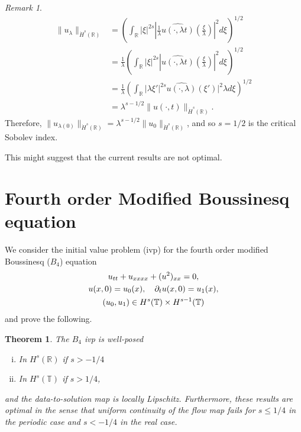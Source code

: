\documentclass[12pt,reqno]{amsart}
\numberwithin{equation}{section}  %
\numberwithin{figure}{section}
\newcommand{\rr}{\mathbb{R}}
\newcommand{\ci}{\mathbb{T}}
\newcommand{\wh}{\widehat}
\newcommand{\p}{\partial}
\theoremstyle{plain}
\newtheorem{theorem}{Theorem}
\theoremstyle{definition}
\theoremstyle{remark}
\newtheorem{remark}{Remark}
\begin{document}
\begin{itemize}
\begin{framed}
\begin{remark}
\begin{equation*}
\begin{split}
  \| u_{\lambda} \|_{\dot{H}^s(\rr)} 
  & = \left( \int_{\rr} | \xi |^{2s} |
  \frac{1}{\lambda}\wh{u(\cdot, \lambda t)}(\frac{\xi}{\lambda}) |^2 d \xi
  \right)^{1/2}
  \\
  & = \frac{1}{\lambda} \left( \int_{\rr}| \xi |^{2s} | \wh{u(\cdot,
  \lambda t)}(\frac{\xi}{\lambda}) |^2 d \xi  \right)^{1/2}
  \\
  & = \frac{1}{\lambda} \left( \int_{\rr} | \lambda \xi' |^{2s} 
  \wh{u(\cdot, \lambda)}(\xi') |^2 \lambda d \xi
  \right)^{1/2}
  \\
  & = \lambda^{s - 1/2} \|u(\cdot, t) \|_{\dot{H}^s (\rr)}.
\end{split}
\end{equation*}
%
%
Therefore, $\| u_{\lambda(0)} \|_{\dot{H}^s(\rr)} = \lambda^{s - 1/2} \|
u_{0} \|_{\dot{H}^{s}(\rr)}$, and so $s=1/2$ is the critical Sobolev index.
\end{remark}
\end{framed}


\end{itemize}

This might suggest that the current results are not optimal.


%

%
%
%
%
%


%
\section{Fourth order Modified Boussinesq  equation}
%
We consider the initial value problem (ivp) for the fourth order modified Boussinesq
($B_4$) equation 
\begin{gather}
  u_{tt}   + u_{xxxx} + (u^2)_{xx} = 0,
  \label{eqn:mb-2}
  \\
  u(x,0) = u_{0}(x), \quad \p_t u(x, 0) = u_1(x), 
  \label{eqn:mb-init-data-2}
  \\
  \notag
  (u_0, u_1) \in
  H^{s}(\ci) \times
  H^{s-1}(\ci)  
\end{gather}
and prove the following.
%
%
%
%
%
%
%
%
\begin{theorem}
  The $B_{4}$ ivp is well-posed
  \begin{enumerate}[(i)]
    \item In $H^s(\rr)$ if $s > -1/4$
    \item In $H^{s}(\ci)$ if $s > 1/4$,
  \end{enumerate}
  and the data-to-solution map is locally Lipschitz. Furthermore, these results
  are optimal in the sense that uniform continuity of the flow map fails for $s
  \le 1/4$ in the periodic case and $s < -1/4$ in the real case. 
  \label{thm:wp-2}
\end{theorem}
%
\end{document}
